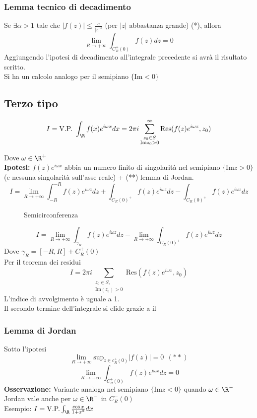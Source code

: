\subsubsection{Lemma tecnico di decadimento}
Se $\exists \alpha >1$ tale che $|f(z)|\le \frac{c}{|z|^\alpha}$ (per $|z|$ abbastanza grande) (*), allora
\[\lim_{R \to +\infty} \int_{C_R^+(0)}^{} f(z)dz=0\]
Aggiungendo l'ipotesi di decadimento all'integrale precedente si avrà il risultato scritto.
\\Si ha un calcolo analogo per il semipiano $\{\text{Im}<0\} $
\subsection{Terzo tipo}
\begin{tcolorbox}	
	\[I=\text{V.P.  }\int_{\R}^{} f(x)e^{i\omega x}dx=2 \pi i \sum_{\substack{z_0\in S\\\text{Im}z_0>0}}^{\infty} \text{Res}(f(z)e^{i\omega z},z_0)\] 
\end{tcolorbox}
Dove $\omega \in \R^+$
\\\textbf{Ipotesi: }$f(z)e^{i\omega x}$ abbia un numero finito di singolarità nel semipiano $\{\text{Im}z>0\} $ (e nessuna singolarità sull'asse reale) + (**) lemma di Jordan.
\[I=\lim_{R \to +\infty} \int_{-R}^{-R} f(z)e^{i\omega z}dz+\int_{C_R(0)^+}^{} f(z)e^{i\omega z}dz-\int_{C_R(0)^+}^{} f(z)e^{i\omega z}dz \]
\begin{figure}[ht]
    \centering
    \caption{Semicirconferenza}
    \label{fig:semicirconferenza}
\end{figure}
\[I=\lim_{R \to +\infty} \int_{\gamma_R}{f(z)e^{i\omega z}dz} -\lim_{R \to +\infty} \int_{C_R(0)^+}^{} f(z)e^{i\omega z}dz\]
Dove $\gamma_R=[-R,R]+C_R^+(0)$
\\Per il teorema dei residui
\[I=2\pi i \sum_{\substack{z_0\in S,\\  \text{Im}(z_0)>0}}^{} \text{Res}(f(z)e^{i\omega x},z_0)\]
L'indice di avvolgimento è uguale a 1.\\
Il secondo termine dell'integrale si elide grazie a il 
\subsubsection{Lemma di Jordan}
Sotto l'ipotesi 
\[\lim_{R \to +\infty}\text{sup}_{z\in c_R^+(0)}|f(z)|=0  \ \ (**)\]
\[\lim_{R \to +\infty} \int_{C_R^+(0)}^{} f(z)e^{i\omega x}dz=0\] 
\textbf{Osservazione:} Variante analoga nel semipiano $\{\text{Im}z<0\} $ quando $\omega \in \R^-$
\\Jordan vale anche per $\omega \in \R^-$ in $C_R^-(0)$
\\Esempio: $I= \text{V.P.}\int_{\R}^{} \frac{\cos x}{1+x^2}dx$
